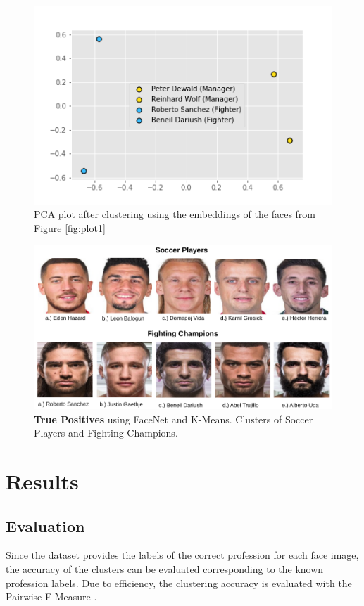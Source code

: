\documentclass[12pt,english]{article}
\begin{document}
\begin{figure}[H]
\begin{minipage}[b]{0.6\textwidth}
    \includegraphics[width=\textwidth]{figures/plot.png}
    \caption{PCA plot after clustering using the embeddings of the faces from Figure \ref{fig:plot1}}
    \label{fig:plot2}
  \end{minipage}
\end{figure}

\begin{figure}[H]
 \centering
    \includegraphics[width=\columnwidth]{figures/soccer_tp.png}
    \caption{\textbf{True Positives} using FaceNet and K-Means. Clusters of Soccer Players and Fighting Champions.}
    \label{fig:ex1tp}
\end{figure}


\section{Results}

\subsection{Evaluation}
\quad
Since the dataset provides the labels of the correct profession for each face image, the accuracy of the clusters can be evaluated corresponding to the known profession labels. Due to efficiency, the clustering accuracy is evaluated with the Pairwise F-Measure \cite{otto}.
\end{document}
